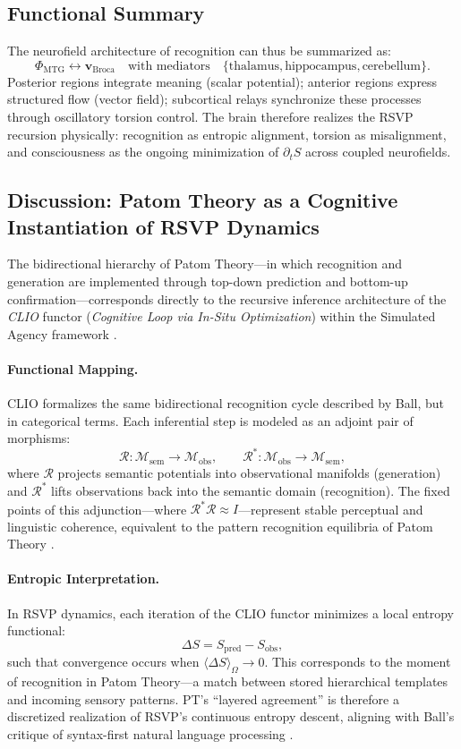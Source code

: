 \documentclass[11pt]{article}
\begin{document}
\subsection{Functional Summary}
The neurofield architecture of recognition can thus be summarized as:
\[
\Phi_{\mathrm{MTG}} \leftrightarrow \mathbf{v}_{\mathrm{Broca}}
\quad \text{with mediators}\quad
\{\text{thalamus}, \text{hippocampus}, \text{cerebellum}\}.
\]
Posterior regions integrate meaning (scalar potential); anterior regions express structured flow (vector field); subcortical relays synchronize these processes through oscillatory torsion control. The brain therefore realizes the RSVP recursion physically: recognition as entropic alignment, torsion as misalignment, and consciousness as the ongoing minimization of $\partial_t S$ across coupled neurofields.

\subsection{Discussion: Patom Theory as a Cognitive Instantiation of RSVP Dynamics}
The bidirectional hierarchy of Patom Theory---in which recognition and generation are implemented through top-down prediction and bottom-up confirmation---corresponds directly to the recursive inference architecture of the \textit{CLIO} functor (\textit{Cognitive Loop via In-Situ Optimization}) within the Simulated Agency framework \citep{cheng2025clio}.

\paragraph{Functional Mapping.}
CLIO formalizes the same bidirectional recognition cycle described by Ball, but in categorical terms. Each inferential step is modeled as an adjoint pair of morphisms:
\[
\mathcal{R} : \mathcal{M}_{\mathrm{sem}} \to \mathcal{M}_{\mathrm{obs}},
\qquad
\mathcal{R}^\ast : \mathcal{M}_{\mathrm{obs}} \to \mathcal{M}_{\mathrm{sem}},
\]
where $\mathcal{R}$ projects semantic potentials into observational manifolds (generation) and $\mathcal{R}^\ast$ lifts observations back into the semantic domain (recognition). The fixed points of this adjunction---where $\mathcal{R}^\ast\mathcal{R}\approx I$---represent stable perceptual and linguistic coherence, equivalent to the pattern recognition equilibria of Patom Theory \citep{ball2015speech, ball2017babitasks}.

\paragraph{Entropic Interpretation.}
In RSVP dynamics, each iteration of the CLIO functor minimizes a local entropy functional:
\[
\Delta S = S_{\mathrm{pred}} - S_{\mathrm{obs}},
\]
such that convergence occurs when $\langle \Delta S \rangle_\Omega \!\to\! 0$. This corresponds to the moment of recognition in Patom Theory---a match between stored hierarchical templates and incoming sensory patterns. PT’s “layered agreement” is therefore a discretized realization of RSVP’s continuous entropy descent, aligning with Ball’s critique of syntax-first natural language processing \citep{ball2019superglue}.
\end{document}
